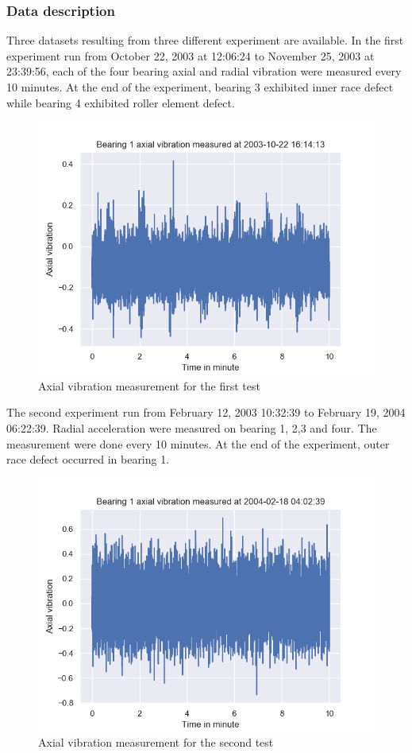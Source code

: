 \documentclass[11pt, oneside]{article}   	%
\begin{document}
\subsubsection{Data description}
Three datasets resulting from three different experiment are available. In the first experiment run from October 22, 2003 at 12:06:24 to November 25, 2003 at 23:39:56, each of the four bearing axial and radial vibration were measured every 10 minutes. At the end of the experiment, bearing 3 exhibited inner race defect while bearing 4 exhibited roller element defect.
\begin{figure}[H] %
   \centering
   \includegraphics[width=7in]{thesis-pictures/bearing1-test1} 
   \caption{Axial vibration measurement for the first test}
   \label{fig:example}
\end{figure}
\justify
The second experiment run from February 12, 2003 10:32:39 to February 19, 2004 06:22:39.  Radial acceleration were measured on bearing 1, 2,3 and four. The measurement were done every 10 minutes. At the end of the experiment, outer race defect occurred in bearing 1.
\begin{figure}[H] %
   \centering
   \includegraphics[width=7in]{thesis-pictures/bearing1-test2} 
   \caption{Axial vibration measurement for the second test}
   \label{fig:example}
\end{figure}
\end{document}
